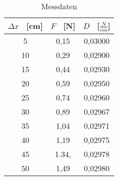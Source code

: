 \documentclass{scrartcl}
\begin{document}
        \begin{table}
            \centering
            \caption{Messdaten}
            \label{tab:Tabelle_1}
            
            \begin{tabular}{c c c}
                \toprule
                {$\Delta x$ \ [cm]} & {$F$ \ [N]} & {$D$ \ [$\frac{N}{cm}$]} \\
                \midrule
                5 & 0,15 & 0,03000\\
                10 & 0,29 & 0,02900\\
                15 & 0,44 & 0,02930\\
                20 & 0,59 & 0,02950\\
                25 & 0,74 & 0,02960\\
                30 & 0,89 & 0,02967\\
                35 & 1,04 & 0,02971\\
                40 & 1,19 & 0,02975\\
                45 & 1.34, & 0,02978\\
                50 & 1,49 & 0,02980\\
                \bottomrule
            \end{tabular}    
        \end{table}
        

        
\end{document}
